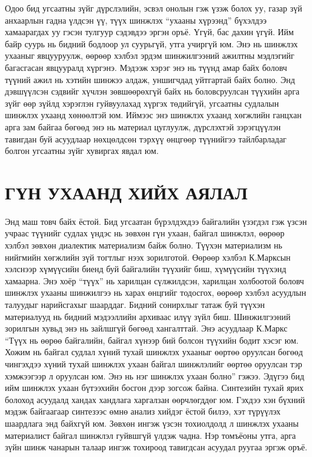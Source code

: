 Одоо бид угсаатны зүйг дүрслэлийн, эсвэл онолын гэж үзэж болох уу, газар зүй анхаарлын гадна үлдсэн үү, түүх шинжлэх “ухааны хүрээнд” бүхэлдээ хамаарагдах уу гэсэн тулгуур сэдэвдээ эргэн оръё. Үгүй, бас дахин үгүй. Ийм байр суурь нь бидний бодлоор ул суурьгүй, утга учиргүй юм. Энэ нь шинжлэх ухааныг явцууруулж, өөрөөр хэлбэл эрдэм шинжилгээний ажилтны мэдлэгийг багасгасан явцууралд хүргэнэ. Мэдээж хэрэг энэ нь түүнд амар байх боловч түүний ажил нь хэтийн шинжээ алдаж, уншигчдад уйтгартай байх болно. Энд дэвшүүлсэн сэдвийг хүчлэн зөвшөөрөхгүй байх нь боловсруулсан түүхийн арга зүйг өөр зүйлд хэрэглэн гуйвуулахад хүргэх төдийгүй, угсаатны судлалын шинжлэх ухаанд хөнөөлтэй юм. Иймээс энэ шинжлэх ухаанд хөгжлийн ганцхан арга зам байгаа бөгөөд энэ нь материал цуглуулж, дүрслэхтэй зэрэгцүүлэн тавигдан буй асуудлаар нөхцөлдсөн тэрхүү өнцгөөр түүнийгээ тайлбарладаг болгон угсаатны зүйг хувиргах явдал юм.

\section*{ГҮН УХААНД ХИЙХ АЯЛАЛ}

Энд маш товч байх ёстой. Бид угсаатан бүрэлдэхдээ байгалийн үзэгдэл гэж үзсэн учраас түүнийг судлах үндэс нь зөвхөн гүн ухаан, байгал шинжлэл, өөрөөр хэлбэл зөвхөн диалектик материализм байж болно. Түүхэн материализм нь нийгмийн хөгжлийн зүй тогтлыг нээх зорилготой. Өөрөөр хэлбэл К.Марксын хэлснээр хүмүүсийн биенд буй байгалийн түүхийг биш, хүмүүсийн түүхэнд хамаарна. Энэ хоёр “түүх” нь харилцан сүлжилдсэн, харилцан холбоотой боловч шинжлэх ухааны шинжилгээ нь харах өнцгийг тодосгох, өөрөөр хэлбэл асуудлын талуудыг нарийсгахыг шаарддаг.
Бидний сонирхлыг татаж буй түүхэн материалууд нь бидний мэдээллийн архиваас илүү зүйл биш. Шинжилгээний зорилгын хувьд энэ нь зайлшгүй бөгөөд хангалттай. Энэ асуудлаар К.Маркс “Түүх нь өөрөө байгалийн, байгал хүнээр бий болсон түүхийн бодит хэсэг юм. Хожим нь байгал судлал хүний тухай шинжлэх ухааныг өөртөө оруулсан бөгөөд чингэхдээ хүний тухай шинжлэх ухаан байгал шинжлэлийг өөртөө оруулсан тэр хэмжээгээр л оруулсан юм. Энэ нь нэг шинжлэх ухаан болно” гэжээ. Эдүгээ бид ийм шинжлэх ухаан бүтээхийн босгон дээр зогсож байна.
Синтезийн тухай ярих болоход асуудалд хандах хандлага харгалзан өөрчлөгддөг юм. Гэхдээ хэн бүхний мэдэж байгаагаар синтезээс өмнө анализ хийдэг ёстой билээ, хэт түрүүлэх шаардлага энд байхгүй юм. Зөвхөн ингэж үзсэн тохиолдолд л шинжлэх ухааны материалист байгал шинжлэл гуйвшгүй үлдэж чадна. Нэр томъёоны утга, арга зүйн шинж чанарын талаар ингэж тохироод тавигдсан асуудал руугаа эргэж оръё.

